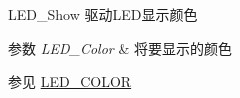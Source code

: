 L\+E\+D\+\_\+\+Show 驱动\+L\+E\+D显示颜色 


\begin{DoxyParams}{参数}
{\em L\+E\+D\+\_\+\+Color} & 将要显示的颜色 \\
\hline
\end{DoxyParams}
\begin{DoxySeeAlso}{参见}
\hyperlink{group__led__driver_ga1f3289eeddfbcff1515a3786dc0518fa}{L\+E\+D\+\_\+\+C\+O\+L\+OR} 
\end{DoxySeeAlso}
